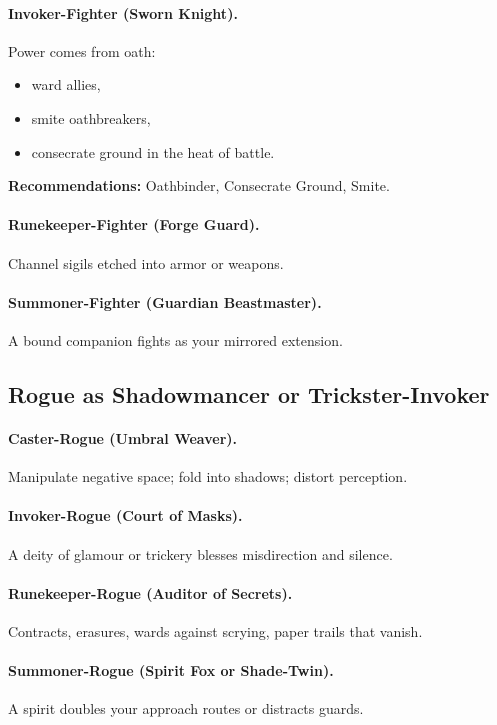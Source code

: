 \documentclass[11pt]{book}
\begin{document}
\paragraph{Invoker-Fighter (Sworn Knight).}
Power comes from oath:
\begin{itemize}
  \item ward allies,
  \item smite oathbreakers,
  \item consecrate ground in the heat of battle.
\end{itemize}
\textbf{Recommendations:} Oathbinder, Consecrate Ground, Smite.

\paragraph{Runekeeper-Fighter (Forge Guard).}
Channel sigils etched into armor or weapons.

\paragraph{Summoner-Fighter (Guardian Beastmaster).}
A bound companion fights as your mirrored extension.

\subsection{Rogue as Shadowmancer or Trickster-Invoker}
\paragraph{Caster-Rogue (Umbral Weaver).}
Manipulate negative space; fold into shadows; distort perception.

\paragraph{Invoker-Rogue (Court of Masks).}
A deity of glamour or trickery blesses misdirection and silence.

\paragraph{Runekeeper-Rogue (Auditor of Secrets).}
Contracts, erasures, wards against scrying, paper trails that vanish.

\paragraph{Summoner-Rogue (Spirit Fox or Shade-Twin).}
A spirit doubles your approach routes or distracts guards.
\end{document}
